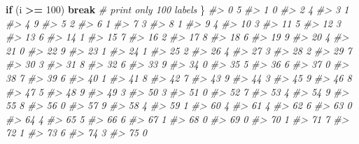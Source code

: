 \documentclass[]{book}
\newenvironment{Shaded}{\begin{snugshade}}{\end{snugshade}}
\newcommand{\CommentTok}[1]{\textcolor[rgb]{0.56,0.35,0.01}{\textit{#1}}}
\newcommand{\ControlFlowTok}[1]{\textcolor[rgb]{0.13,0.29,0.53}{\textbf{#1}}}
\newcommand{\DecValTok}[1]{\textcolor[rgb]{0.00,0.00,0.81}{#1}}
\newcommand{\NormalTok}[1]{#1}
\newcommand{\OperatorTok}[1]{\textcolor[rgb]{0.81,0.36,0.00}{\textbf{#1}}}
\newcommand{\StringTok}[1]{\textcolor[rgb]{0.31,0.60,0.02}{#1}}
\begin{document}
\begin{Shaded}
\begin{Highlighting}[]
{{    \ControlFlowTok{if}\NormalTok{ (i }\OperatorTok{>=}\StringTok{ }\DecValTok{100}\NormalTok{) }\ControlFlowTok{break}   \CommentTok{# print only 100 labels}
\NormalTok{\}}
\CommentTok{#>        0     5 }
\CommentTok{#>        1     0 }
\CommentTok{#>        2     4 }
\CommentTok{#>        3     1 }
\CommentTok{#>        4     9 }
\CommentTok{#>        5     2 }
\CommentTok{#>        6     1 }
\CommentTok{#>        7     3 }
\CommentTok{#>        8     1 }
\CommentTok{#>        9     4 }
\CommentTok{#>       10     3 }
\CommentTok{#>       11     5 }
\CommentTok{#>       12     3 }
\CommentTok{#>       13     6 }
\CommentTok{#>       14     1 }
\CommentTok{#>       15     7 }
\CommentTok{#>       16     2 }
\CommentTok{#>       17     8 }
\CommentTok{#>       18     6 }
\CommentTok{#>       19     9 }
\CommentTok{#>       20     4 }
\CommentTok{#>       21     0 }
\CommentTok{#>       22     9 }
\CommentTok{#>       23     1 }
\CommentTok{#>       24     1 }
\CommentTok{#>       25     2 }
\CommentTok{#>       26     4 }
\CommentTok{#>       27     3 }
\CommentTok{#>       28     2 }
\CommentTok{#>       29     7 }
\CommentTok{#>       30     3 }
\CommentTok{#>       31     8 }
\CommentTok{#>       32     6 }
\CommentTok{#>       33     9 }
\CommentTok{#>       34     0 }
\CommentTok{#>       35     5 }
\CommentTok{#>       36     6 }
\CommentTok{#>       37     0 }
\CommentTok{#>       38     7 }
\CommentTok{#>       39     6 }
\CommentTok{#>       40     1 }
\CommentTok{#>       41     8 }
\CommentTok{#>       42     7 }
\CommentTok{#>       43     9 }
\CommentTok{#>       44     3 }
\CommentTok{#>       45     9 }
\CommentTok{#>       46     8 }
\CommentTok{#>       47     5 }
\CommentTok{#>       48     9 }
\CommentTok{#>       49     3 }
\CommentTok{#>       50     3 }
\CommentTok{#>       51     0 }
\CommentTok{#>       52     7 }
\CommentTok{#>       53     4 }
\CommentTok{#>       54     9 }
\CommentTok{#>       55     8 }
\CommentTok{#>       56     0 }
\CommentTok{#>       57     9 }
\CommentTok{#>       58     4 }
\CommentTok{#>       59     1 }
\CommentTok{#>       60     4 }
\CommentTok{#>       61     4 }
\CommentTok{#>       62     6 }
\CommentTok{#>       63     0 }
\CommentTok{#>       64     4 }
\CommentTok{#>       65     5 }
\CommentTok{#>       66     6 }
\CommentTok{#>       67     1 }
\CommentTok{#>       68     0 }
\CommentTok{#>       69     0 }
\CommentTok{#>       70     1 }
\CommentTok{#>       71     7 }
\CommentTok{#>       72     1 }
\CommentTok{#>       73     6 }
\CommentTok{#>       74     3 }
\CommentTok{#>       75     0 }
}}
\end{Highlighting}
\end{Shaded}
\end{document}
